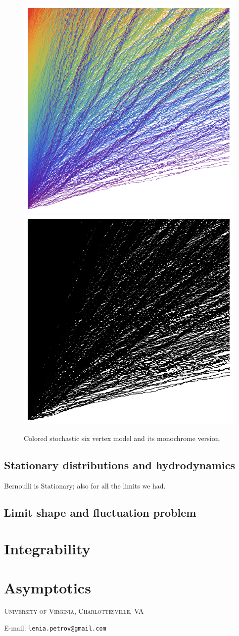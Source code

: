\documentclass[letterpaper,11pt,oneside,reqno]{article}
\numberwithin{equation}{section}
\theoremstyle{definition}
\begin{document}
\begin{figure}[htpb]
	\centering
	\includegraphics[width=.3\textwidth]{./images/CS6V.png}
	\quad
	\includegraphics[width=.3\textwidth]{./images/S6V.png}
	\caption{Colored stochastic six vertex model and its monochrome version.}
	\label{fig:CS6V}
\end{figure}




\subsection{Stationary distributions and hydrodynamics}
\label{sub:hydrodynamic_analysis}




Bernoulli is Stationary; also for all the limits we had.

\subsection{Limit shape and fluctuation problem}
\label{sub:limit_shape_problem}










\newpage
\section{Integrability}
\label{sec:integrability}





\newpage
\section{Asymptotics}
\label{sec:asymptotics}







\newpage



\medskip

\textsc{University of Virginia, Charlottesville, VA}

E-mail: \texttt{lenia.petrov@gmail.com}
\end{document}
